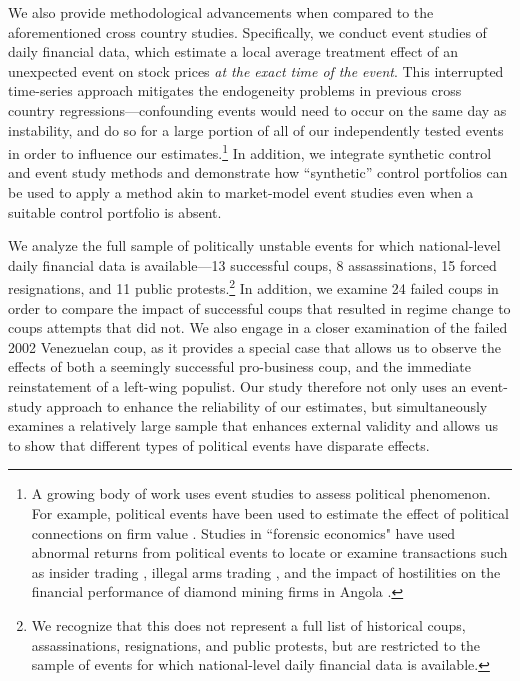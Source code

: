 \documentclass[12pt,final,fleqn]{article}
\theoremstyle{plain}
\begin{document}
We also provide methodological advancements when compared to the aforementioned cross country studies. Specifically, we conduct event studies of daily financial data, which estimate a local average treatment effect of an unexpected event on stock prices \textit{at the exact time of the event}. This interrupted time-series approach mitigates the endogeneity problems in previous cross country regressions---confounding events would need to occur on the same day as instability, and do so for a large portion of all of our independently tested events in order to influence our estimates.\footnote{A growing body of work uses event studies to assess political phenomenon.  For example, political events have been used to estimate the effect of political connections on firm value \citep[e.g.][]{fisman2001estimating,faccio2006politically,goldman2009politically}. Studies in ``forensic economics" have used abnormal returns from political events to locate or examine transactions such as insider trading \citep{dube2011coups}, illegal arms trading \citep{dellavigna2010detecting}, and the impact of hostilities on the financial performance of diamond mining firms in Angola \citep{guidolin2007diamonds}.} In addition, we integrate synthetic control and event study methods and demonstrate how ``synthetic'' control portfolios can be used to apply a method akin to market-model event studies even when a suitable control portfolio is absent.

We analyze the full sample of politically unstable events for which national-level daily financial data is available---13 successful coups, 8 assassinations, 15 forced resignations, and 11 public protests.\footnote{We recognize that this does not represent a full list of historical coups, assassinations, resignations, and public protests, but are restricted to the sample of events for which national-level daily financial data is available.} In addition, we examine 24 failed coups in order to compare the impact of successful coups that resulted in regime change to coups attempts that did not. We also engage in a closer examination of the failed 2002 Venezuelan coup, as it provides a special case that allows us to observe the effects of both a seemingly successful pro-business coup, and the immediate reinstatement of a left-wing populist. Our study therefore not only uses an event-study approach to enhance the reliability of our estimates, but simultaneously examines a relatively large sample that enhances external validity and allows us to show that different types of political events have disparate effects. 
\end{document}
